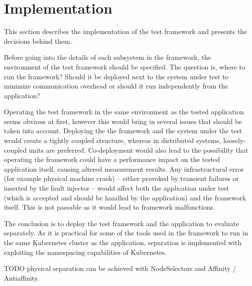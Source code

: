 \section{Implementation}


This section describes the implementation of the test framework and presents the decisions behind them.

Before going into the details of each subsystem in the framework, the environment of the test framework should be specified. The question is, where to run the framework? Should it be deployed next to the system under test to minimize communication overhead or should it run independently from the application?

Operating the test framework in the same environment as the tested application seems obvious at first, however this would bring in several issues that should be taken into account. Deploying the the framework and the system under the test would create a tightly coupled structure, whereas in distributed systems, loosely-coupled units are preferred. Co-deployment would also lead to the possibility that operating the framework could have a performance impact on the tested application itself, causing altered measurement results. Any infrastructural error (for example physical machine crash) -- either provoked by transient failures or inserted by the fault injector -- would affect both the application under test (which is accepted and should be handled by the application) and the framework itself. This is not passable as it would lead to framework malfunctions.

The conclusion is to deploy the test framework and the application to evaluate separately. As it is practical for some of the tools used in the framework to run in the same Kubernetes cluster as the application, separation is implemented with exploiting the namespacing capabilities of Kubernetes.

TODO physical separation can be achieved with NodeSelectors and Affinity / Antiaffinity.

